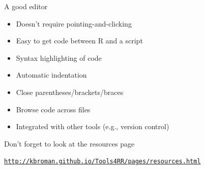 \documentclass[12pt,t]{beamer}
\newcommand{\bi}{\begin{itemize}}
\newcommand{\ei}{\end{itemize}}
\begin{document}
\begin{frame}{A good editor}

\vspace{24pt}

\bi
\itemsep12pt
\item Doesn't require pointing-and-clicking
\item Easy to get code between R and a script
\item Syntax highlighting of code
\item Automatic indentation
\item Close parentheses/brackets/braces
\item Browse code across files
\item Integrated with other tools (e.g., version control)
\ei

\end{frame}


\begin{frame}[c]{Don't forget to look at the resources page}


\centerline{\href{http://kbroman.github.io/Tools4RR/pages/resources.html}{\tt http://kbroman.github.io/Tools4RR/pages/resources.html}}

\end{frame}
\end{document}
